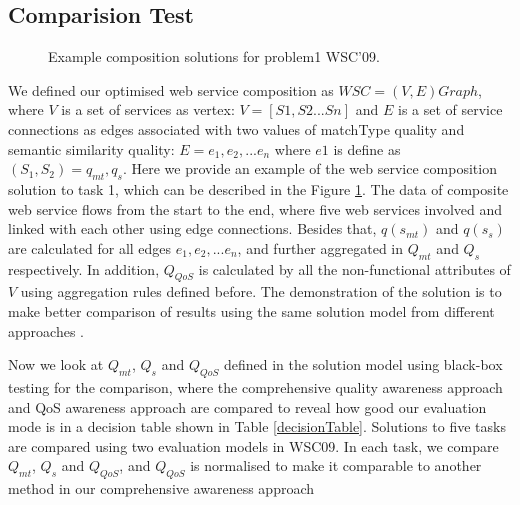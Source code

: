 \documentclass{llncs}
\begin{document}
\subsection{Comparision Test}\label{comparisionTest}
\begin{figure}[h]
\centerline{
}
 \caption{Example composition solutions for problem1 WSC'09.}
 \label{wscs}
\end{figure}
We defined our optimised web service composition as $WSC = (V, E)Graph$, where $V$ is a set of services as vertex: $V=[S1, S2...Sn]$ and $E$ is a set of service connections as edges associated with two values of matchType quality and semantic similarity quality: $E = {e_{1}, e_{2},... e_{n}}$ where $e1$ is define as $(S_{1},S_{2})={q_{mt}, q_{s}}$. Here we provide an example of the web service composition solution to task 1, which can be described in the Figure \ref{wscs}. The data of composite web service flows from the start to the end, where five web services involved and linked with each other using edge connections. Besides that, $q(s_{mt})$ and $q(s_{s})$ are calculated for all edges ${e_{1}, e_{2},... e_{n}}$, and further aggregated in $Q_{mt}$ and $Q_{s}$ respectively. In addition, $Q_{QoS}$ is calculated by all the non-functional attributes of $V$ using aggregation rules defined before. The demonstration of the solution is to make better comparison of results using the same solution model from different approaches .

Now we look at $Q_{mt}$, $Q_{s}$ and $Q_{QoS}$ defined in the solution model using black-box testing for the comparison, where the comprehensive quality awareness approach and QoS awareness approach \cite{feng2013dynamic,huang2009effective,ma2015hybrid,da2014graph} are compared to reveal how good our evaluation mode is in a decision table shown in Table \ref{decisionTable}. Solutions to five tasks are compared using two evaluation models in WSC09. In each task, we compare $Q_{mt}$, $Q_{s}$ and $Q_{QoS}$, and $Q_{QoS}$ is normalised to make it comparable to another method in our comprehensive awareness approach 
\end{document}
